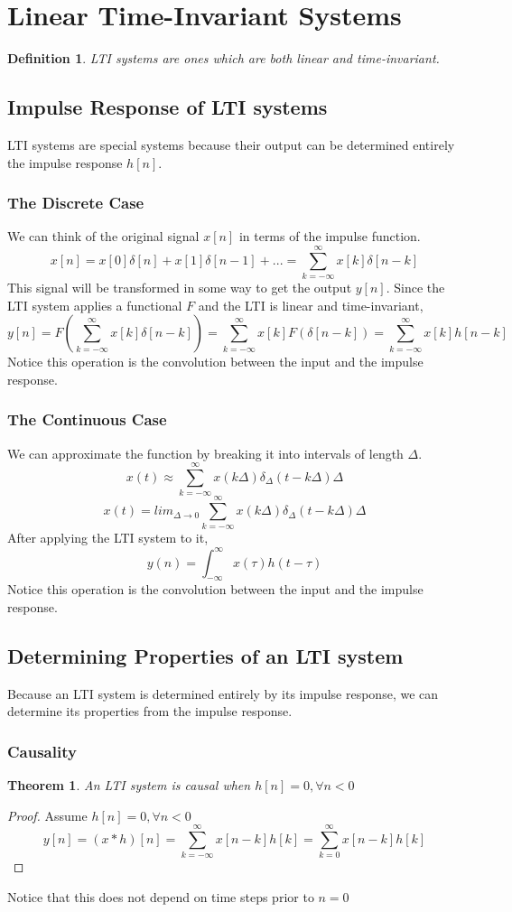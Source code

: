 \documentclass{article}
\newtheorem{theorem}{Theorem}
\newtheorem{definition}{Definition}
\newtheorem{proof}{Proof}
\begin{document}
\section{Linear Time-Invariant Systems}
\begin{definition}
    LTI systems are ones which are both linear and time-invariant.
\end{definition}
\subsection{Impulse Response of LTI systems}
LTI systems are special systems because their output can be determined entirely the impulse response $h[n]$.
\subsubsection{The Discrete Case}
We can think of the original signal $x[n]$ in terms of the impulse function.
$$x[n] = x[0]\delta[n]+x[1]\delta[n-1]+... = \sum_{k=-\infty}^{\infty}{x[k]\delta[n-k]}$$
This signal will be transformed in some way to get the output $y[n]$.
Since the LTI system applies a functional $F$ and the LTI is linear and time-invariant,
$$y[n] = F(\sum_{k=-\infty}^{\infty}{x[k]\delta[n-k]}) = \sum_{k=-\infty}^{\infty}{x[k]F(\delta[n-k])} = \sum_{k=-\infty}^{\infty}{x[k]h[n-k]}$$
Notice this operation is the convolution between the input and the impulse response.
\subsubsection{The Continuous Case}
We can approximate the function by breaking it into intervals of length $\Delta$.
$$x(t) \approx \sum_{k=-\infty}^{\infty}{x(k\Delta)\delta_{\Delta}(t-k\Delta)\Delta}$$
$$x(t) = lim_{\Delta \rightarrow 0}\sum_{k=-\infty}^{\infty}{x(k\Delta)\delta_{\Delta}(t-k\Delta)\Delta}$$
After applying the LTI system to it,
$$y(n) = \int_{-\infty}^{\infty}{x(\tau)h(t-\tau)}$$
Notice this operation is the convolution between the input and the impulse response.
\subsection{Determining Properties of an LTI system}
Because an LTI system is determined entirely by its impulse response, we can determine its properties from the impulse response.
\subsubsection{Causality}
\begin{theorem}
    An LTI system is causal when $h[n] = 0, \forall n < 0$
\end{theorem}
\begin{proof}
Assume $h[n] = 0, \forall n < 0$
$$y[n] = (x*h)[n] = \sum_{k=-\infty}^{\infty}{x[n-k]h[k]}=\sum_{k=0}^{\infty}{x[n-k]h[k]}$$
\end{proof}
Notice that this does not depend on time steps prior to $n=0$
\end{document}
